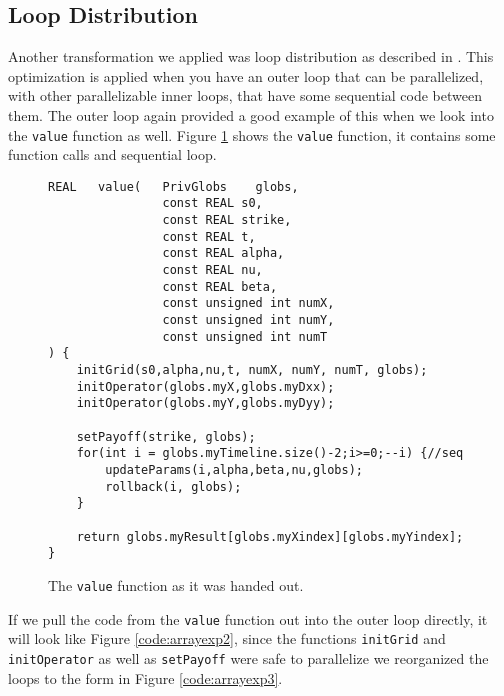 \subsection{Loop Distribution}

Another transformation we applied was loop distribution as described in
\cite[Slide 13]{projectslide}. This optimization is applied when you have an
outer loop that can be parallelized, with other parallelizable inner loops, that
have some sequential code between them. The outer loop again provided a good
example of this when we look into the \texttt{value} function as well. Figure
\ref{code:predistvalue} shows the \texttt{value} function, it contains some
function calls and sequential loop.

\begin{figure}[H]
    \begin{lstlisting}
REAL   value(   PrivGlobs    globs,
                const REAL s0,
                const REAL strike,
                const REAL t,
                const REAL alpha,
                const REAL nu,
                const REAL beta,
                const unsigned int numX,
                const unsigned int numY,
                const unsigned int numT
) {
    initGrid(s0,alpha,nu,t, numX, numY, numT, globs);
    initOperator(globs.myX,globs.myDxx);
    initOperator(globs.myY,globs.myDyy);

    setPayoff(strike, globs);
    for(int i = globs.myTimeline.size()-2;i>=0;--i) {//seq
        updateParams(i,alpha,beta,nu,globs);
        rollback(i, globs);
    }

    return globs.myResult[globs.myXindex][globs.myYindex];
}
    \end{lstlisting}
    \caption{The \texttt{value} function as it was handed out.}
    \label{code:predistvalue}
\end{figure}

If we pull the code from the \texttt{value} function out into the outer loop
directly, it will look like Figure \ref{code:arrayexp2}, since the functions
\texttt{initGrid} and \texttt{initOperator} as well as \texttt{setPayoff} were
safe to parallelize we reorganized the loops to the form in Figure
\ref{code:arrayexp3}.

